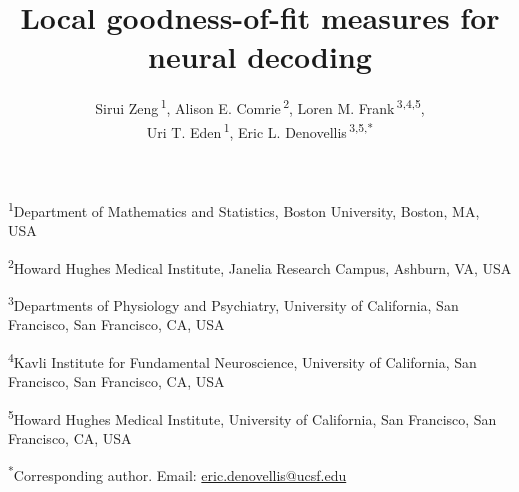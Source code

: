 \documentclass[12pt]{article}
\begin{document}
\title{\bfseries Local goodness-of-fit measures for neural decoding}
\author{%
    Sirui Zeng\,\textsuperscript{1},
    Alison E. Comrie\,\textsuperscript{2},
    Loren M. Frank\,\textsuperscript{3,4,5}, \\
    Uri T. Eden\,\textsuperscript{1},
    Eric L. Denovellis\,\textsuperscript{3,5,*}
}
\date{}
\maketitle
\thispagestyle{empty}

{\small
    \noindent\textsuperscript{1}Department of Mathematics and Statistics, Boston University, Boston, MA, USA

    \noindent\textsuperscript{2}Howard Hughes Medical Institute, Janelia Research Campus, Ashburn, VA, USA

    \noindent\textsuperscript{3}Departments of Physiology and Psychiatry, University of California, San Francisco, San Francisco, CA, USA

    \noindent\textsuperscript{4}Kavli Institute for Fundamental Neuroscience, University of California, San Francisco, San Francisco, CA, USA

    \noindent\textsuperscript{5}Howard Hughes Medical Institute, University of California, San Francisco, San Francisco, CA, USA

    \noindent\textsuperscript{*}Corresponding author. Email: \href{mailto:eric.denovellis@ucsf.edu}{eric.denovellis@ucsf.edu}
    \par}

\vspace{0.5em}
\end{document}
